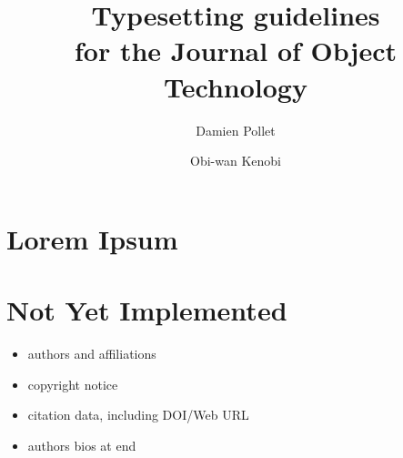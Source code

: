 \documentclass{jot}
\title{Typesetting guidelines\\ for the Journal of Object Technology}
\author{Damien Pollet}
\author{Obi-wan Kenobi}
\begin{document}
\begin{abstract}
    \lipsum[1-2]
\end{abstract}


\section{Lorem Ipsum}

\lipsum


\section{Not Yet Implemented}

\begin{itemize}

	\item authors and affiliations
          
	\item copyright notice
          
	\item citation data, including DOI/Web URL
          
	\item authors bios at end

\end{itemize}
\end{document}
